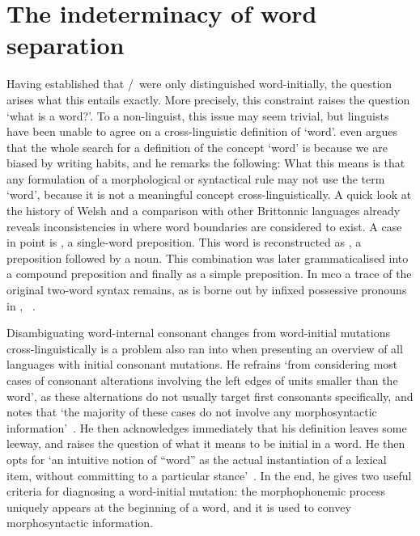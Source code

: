 \section{The indeterminacy of word separation}
\label{sec:indet-word-separ}
Having established that \lT/\xD\ were only distinguished word-initially, the question arises what this entails exactly. More precisely, this constraint raises the question `what is a word?'.
To a non-linguist, this issue may seem trivial, but linguists have been unable to agree on a cross-linguistic definition of `word'.
\Textcite[28]{haspelmath_indeterminacy_2011} even argues that the whole search for a definition of the concept `word' is because we are biased by writing habits, and he remarks the following: 
What this means is that any formulation of a morphological or syntactical rule may not use the term `word', because it is not a meaningful concept cross-linguistically. 
A quick look at the history of Welsh and a comparison with other Brittonnic languages already reveals inconsistencies in where word boundaries are considered to exist.
A case in point is , a single-word preposition.
This word is reconstructed as  \autocite[258]{schrijver_studies_1995}, a preposition followed by a noun.
This combination was later grammaticalised into a compound preposition and finally as a simple preposition.
In \gls{mco} a trace of the original two-word syntax remains, as is borne out by infixed possessive pronouns in , \etc~\autocite[120]{koch_neo-brittonic_1989}.

Disambiguating word-internal consonant changes from word-initial mutations cross-linguistically is  a problem \textcite{iosad_right_2010} also ran into when presenting an overview of all languages with initial consonant mutations.
He refrains `from considering most cases of consonant alterations involving the left edges of units smaller than the word', as these alternations do not usually target first consonants specifically, and notes that `the majority of these cases do not involve any morphosyntactic information'~\autocite[108]{iosad_right_2010}.
He then acknowledges immediately that his definition leaves some leeway, and raises the question of what it means to be initial in a word.
He then opts for `an intuitive notion of ``word'' as the actual instantiation of a lexical item, without committing to a particular stance'~\autocite[109]{iosad_right_2010}.
In the end, he gives two useful criteria for diagnosing a word-initial mutation: the morphophonemic process uniquely appears at the beginning of a word, and it is used to convey morphosyntactic information.

